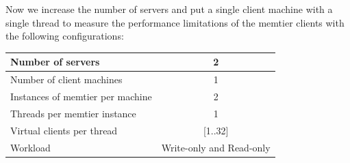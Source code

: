 \documentclass[11pt,a4paper]{article}
\begin{document}
Now we increase the number of servers and put a single client machine with a single thread to measure the performance limitations of the memtier clients with the following configurations:

\begin{center}
	\scriptsize{
		\begin{tabular}{|l|c|}
			\hline Number of servers                & 2                        \\ 
			\hline Number of client machines        & 1                        \\ 
			\hline Instances of memtier per machine & 2                        \\ 
			\hline Threads per memtier instance     & 1                        \\
			\hline Virtual clients per thread       & [1..32]                  \\ 
			\hline Workload                         & Write-only and Read-only \\
			\hline 
		\end{tabular}
	} 
\end{center}
\end{document}
